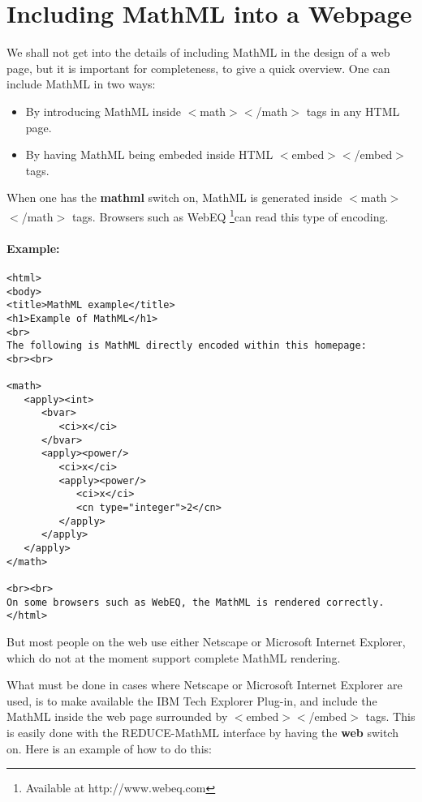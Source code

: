 \documentclass{article}
\begin{document}
\section{Including MathML into a Webpage}

We shall not get into the details of including MathML in the design of a
web page, but it is important for completeness, to give a quick overview.
One can include MathML in two ways:

\begin{itemize} 

\item By introducing MathML inside $<$math$>$$<$/math$>$ tags in any HTML 
page.

\item By having MathML being embeded inside HTML $<$embed$>$$<$/embed$>$
tags. 

\end{itemize} 

When one has the {\bf mathml} switch on, MathML is generated inside
$<$math$>$$<$/math$>$ tags. Browsers such as WebEQ \footnote{Available at
http://www.webeq.com}can read this type of encoding. 

\paragraph{Example:}
\begin{verbatim} 
<html>
<body>
<title>MathML example</title>
<h1>Example of MathML</h1>
<br>
The following is MathML directly encoded within this homepage:
<br><br>

<math>
   <apply><int>
      <bvar>
         <ci>x</ci>
      </bvar>
      <apply><power/>
         <ci>x</ci>
         <apply><power/>
            <ci>x</ci>
            <cn type="integer">2</cn>
         </apply>
      </apply>
   </apply>
</math>

<br><br>
On some browsers such as WebEQ, the MathML is rendered correctly.
</html>

\end{verbatim} 

But most people on the web use either Netscape or Microsoft Internet
Explorer, which do not at the moment support complete MathML rendering. 

What must be done in cases where Netscape or Microsoft Internet Explorer
are used, is to make available the IBM Tech Explorer Plug-in, and include
the MathML inside the web page surrounded by $<$embed$>$$<$/embed$>$ tags.
This is easily done with the REDUCE-MathML interface by having the {\bf
web} switch on. Here is an example of how to do this:
\end{document}
